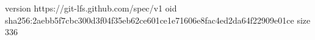 version https://git-lfs.github.com/spec/v1
oid sha256:2aebb5f7cbc300d3f04f35eb62ce601ce1e71606e8fac4ed2da64f22909e01ce
size 336
